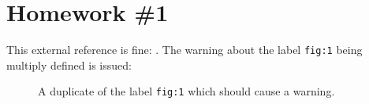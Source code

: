 \documentclass{article}
\begin{document}
\section{Homework \#1}
This external reference is fine: . The warning about the label \verb|fig:1| being multiply defined is issued: 

\begin{figure}[htbp]
    \centering
    \caption{A duplicate of the label \texttt{fig:1} which should cause a warning.}
    \label{fig:1}
\end{figure}
\end{document}
